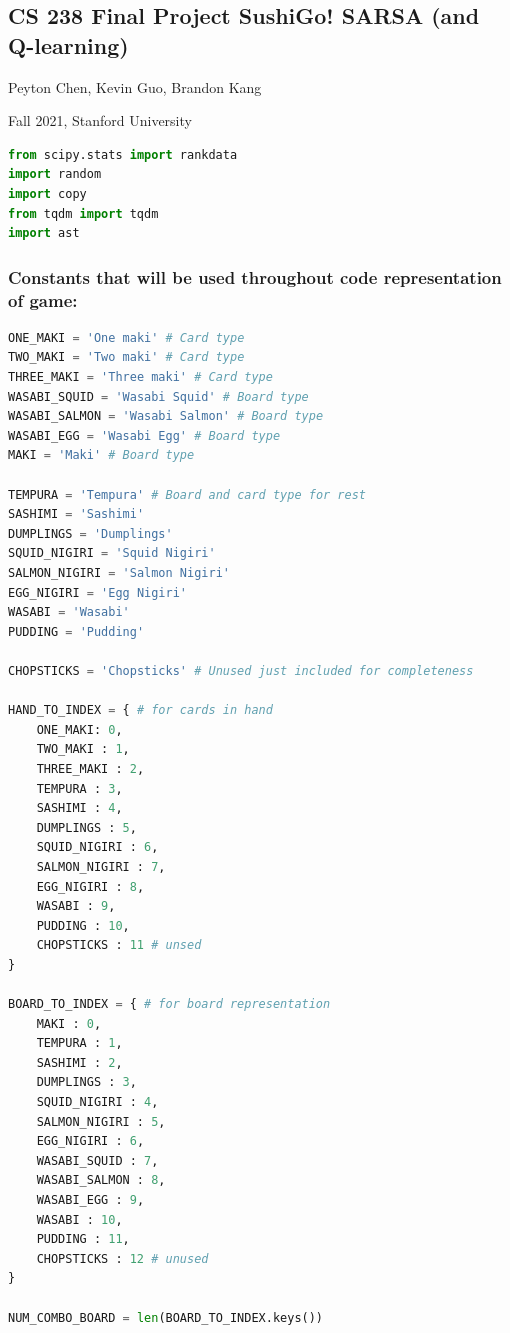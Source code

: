 \hypertarget{cs-238-final-project-sushigo-sarsa-and-q-learning}{%
\subsection{CS 238 Final Project SushiGo! SARSA (and
Q-learning)}\label{cs-238-final-project-sushigo-sarsa-and-q-learning}}

Peyton Chen, Kevin Guo, Brandon Kang

Fall 2021, Stanford University

\begin{lstlisting}[language=Python]
from scipy.stats import rankdata
import random
import copy
from tqdm import tqdm
import ast
\end{lstlisting}

\hypertarget{constants-that-will-be-used-throughout-code-representation-of-game}{%
\subsubsection{Constants that will be used throughout code
representation of
game:}\label{constants-that-will-be-used-throughout-code-representation-of-game}}

\begin{lstlisting}[language=Python]
ONE_MAKI = 'One maki' # Card type
TWO_MAKI = 'Two maki' # Card type
THREE_MAKI = 'Three maki' # Card type
WASABI_SQUID = 'Wasabi Squid' # Board type
WASABI_SALMON = 'Wasabi Salmon' # Board type
WASABI_EGG = 'Wasabi Egg' # Board type
MAKI = 'Maki' # Board type

TEMPURA = 'Tempura' # Board and card type for rest
SASHIMI = 'Sashimi'
DUMPLINGS = 'Dumplings'
SQUID_NIGIRI = 'Squid Nigiri'
SALMON_NIGIRI = 'Salmon Nigiri'
EGG_NIGIRI = 'Egg Nigiri'
WASABI = 'Wasabi'
PUDDING = 'Pudding'

CHOPSTICKS = 'Chopsticks' # Unused just included for completeness

HAND_TO_INDEX = { # for cards in hand
    ONE_MAKI: 0,
    TWO_MAKI : 1,
    THREE_MAKI : 2,
    TEMPURA : 3,
    SASHIMI : 4,
    DUMPLINGS : 5,
    SQUID_NIGIRI : 6,
    SALMON_NIGIRI : 7,
    EGG_NIGIRI : 8,
    WASABI : 9,
    PUDDING : 10,
    CHOPSTICKS : 11 # unsed
}

BOARD_TO_INDEX = { # for board representation
    MAKI : 0,
    TEMPURA : 1,
    SASHIMI : 2,
    DUMPLINGS : 3,
    SQUID_NIGIRI : 4,
    SALMON_NIGIRI : 5,
    EGG_NIGIRI : 6,
    WASABI_SQUID : 7,
    WASABI_SALMON : 8,
    WASABI_EGG : 9,
    WASABI : 10,
    PUDDING : 11,
    CHOPSTICKS : 12 # unused
}

NUM_COMBO_BOARD = len(BOARD_TO_INDEX.keys())
\end{lstlisting}

